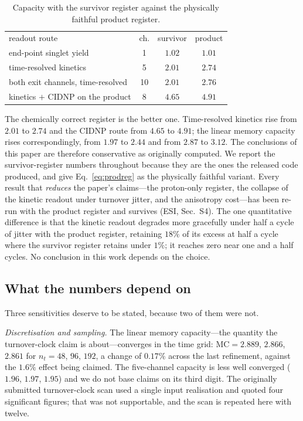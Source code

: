 \documentclass[aps,prx,reprint,superscriptaddress,nofootinbib,floatfix]{revtex4-2}
\begin{document}
\begin{table}[htbp]
\caption{\label{tab:prodreg}Capacity with the survivor register against the physically faithful product register.}
\begin{ruledtabular}
\begin{tabular}{lccc}
readout route & ch. & survivor & product \\
end-point singlet yield & 1 & $1.02$ & $1.01$ \\
time-resolved kinetics & 5 & $2.01$ & $\mathbf{2.74}$ \\
both exit channels, time-resolved & 10 & $2.01$ & $2.76$ \\
kinetics $+$ CIDNP on the product & 8 & $4.65$ & $\mathbf{4.91}$ \\
\end{tabular}
\end{ruledtabular}
\end{table}

The chemically correct register is the better one. Time-resolved kinetics rise
from $2.01$ to $2.74$ and the CIDNP route from $4.65$ to $4.91$; the linear memory
capacity rises correspondingly, from $1.97$ to $2.44$ and from $2.87$ to $3.12$.
The conclusions of this paper are therefore conservative as originally computed.
We report the survivor-register numbers throughout because they are the ones the
released code produced, and give Eq.~\eqref{eq:prodreg} as the physically faithful
variant. Every result that \emph{reduces} the paper's claims---the proton-only
register, the collapse of the kinetic readout under turnover jitter, and the
anisotropy cost---has been re-run with the product register and survives
(ESI, Sec.~S4). The one quantitative difference is that the
kinetic readout degrades more gracefully under half a cycle of jitter with the
product register, retaining $18\%$ of its excess at half a cycle where the
survivor register retains under $1\%$; it reaches zero near one and a half
cycles. No conclusion in
this work depends on the choice.

\subsection{What the numbers depend on}
\label{sec:errorbudget}

Three sensitivities deserve to be stated, because two of them were not.

\emph{Discretisation and sampling.} The linear memory capacity---the quantity the
turnover-clock claim is about---converges in the time grid: $\mathrm{MC}=2.889$,
$2.866$, $2.861$ for $n_t=48$, $96$, $192$, a change of $0.17\%$ across the last
refinement, against the $1.6\%$ effect being claimed. The five-channel capacity is
less well converged ($1.96$, $1.97$, $1.95$) and we do not base claims on its
third digit. The originally submitted turnover-clock scan used a single input
realisation and quoted four significant figures; that was not supportable, and the
scan is repeated here with twelve.
\end{document}
